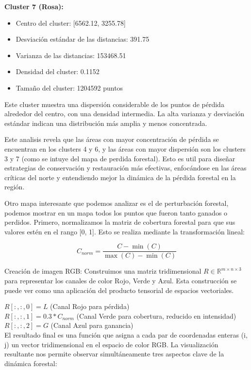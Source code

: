 \documentclass[11pt]{article}
\begin{document}
\textbf{Cluster 7 (Rosa):}
    \begin{itemize}
        \item Centro del cluster: [6562.12, 3255.78]
        \item Desviación estándar de las distancias: 391.75
        \item Varianza de las distancias: 153468.51
        \item Densidad del cluster: 0.1152
        \item Tamaño del cluster: 1204592 puntos
    \end{itemize}
Este cluster muestra una dispersión considerable de los puntos de pérdida alrededor del centro, con una densidad intermedia. La alta varianza y desviación estándar indican una distribución más amplia y menos concentrada.

Este analisis revela que las áreas con mayor concentración de pérdida se encuentran en los clusters 4 y 6, y las áreas con mayor dispersión son los clusters 3 y 7 (como se intuye del mapa de perdida forestal). Esto es util para diseñar estrategias de conservación y restauración más efectivas, enfocándose en las áreas críticas del norte y entendiendo mejor la dinámica de la pérdida forestal en la región. 


Otro mapa interesante que podemos analizar es el de perturbación forestal, podemos mostrar en un mapa todos los puntos que fueron tanto ganados o perdidos.
Primero, normalizamos la matriz de cobertura forestal para que sus valores estén en el rango [0, 1]. Esto se realiza mediante la transformación lineal:

\begin{equation}
    C_{norm} = \frac{C - \min(C)}{\max(C) - \min(C)}
\end{equation}

Creación de imagen RGB:
Construimos una matriz tridimensional $R \in \mathbb{R}^{m \times n \times 3}$ para representar los canales de color Rojo, Verde y Azul. Esta construcción se puede ver como una aplicación del producto tensorial de espacios vectoriales.

$R[:,:,0] = L$ (Canal Rojo para pérdida)\\
$R[:,:,1] = 0.3  *  C_{norm}$ (Canal Verde para cobertura, reducido en intensidad)\\
$R[:,:,2] = G$ (Canal Azul para ganancia)\\

El resultado final es una función que asigna a cada par de coordenadas enteras (i, j) un vector tridimensional en el espacio de color RGB.
La visualización resultante nos permite observar simultáneamente tres aspectos clave de la dinámica forestal:
\end{document}
